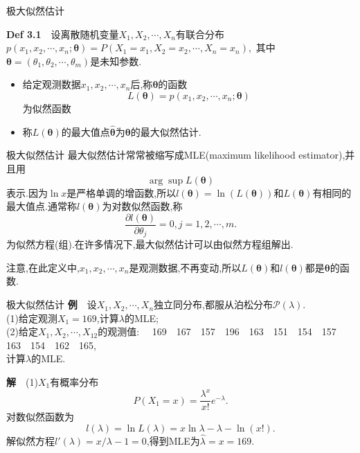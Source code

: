 	\begin{frame}{极大似然估计}
		\begin{block}{\textbf{Def 3.1}$\quad$设离散随机变量$X_1,X_2,\cdots,X_n$有联合分布}
			$p(x_1,x_2,\cdots,x_n;\bm{\theta}) = P(X_1=x_1,X_2=x_2,\cdots,X_n=x_n),$
			其中$\bm{\theta} = (\theta_1,\theta_2,\cdots,\theta_m)$是未知参数.
			\begin{itemize}
				\item 给定观测数据$x_1,x_2,\cdots,x_n$后,称$\bm{\theta}$的函数\begin{equation}
					L(\bm{\theta}) = p(x_1,x_2,\cdots,x_n;\bm{\theta})
				\end{equation}
				为\alert{似然函数}
				\item 称$L(\bm{\theta})$的最大值点$\widehat{\bm{\theta}}$为$\bm{\theta}$的\alert{最大似然估计}.
			\end{itemize}
		\end{block}
	\end{frame}

	\begin{frame}{极大似然估计}
		最大似然估计常常被缩写成MLE(maximum likelihood estimator),并且用
		\begin{equation}
			\arg\sup L(\bm{\theta})
		\end{equation}
		表示.因为$\ln x$是严格单调的增函数,所以$l(\bm{\theta}) = \ln(L(\bm{\theta}))$和$L(\bm{\theta})$有相同的最大值点.通常称$l(\bm{\theta})$为\alert{对数似然函数},称
		\begin{equation}
			\frac{\partial l(\bm{\theta})}{\partial \theta_j} = 0,j = 1,2,\cdots,m.
		\end{equation}
		为似然方程(组).在许多情况下,最大似然估计可以由似然方程组解出.
		
		注意,在此定义中,$x_1,x_2,\cdots,x_n$是观测数据,不再变动,所以$L(\bm{\theta})$和$l(\bm{\theta})$都是$\bm{\theta}$的函数.
	\end{frame}

	\begin{frame}{极大似然估计}
		\textbf{例}$\quad$设$X_1,X_2,\cdots,X_n$独立同分布,都服从泊松分布$\mathcal{P}(\lambda)$.\\
		(1)给定观测$X_1 = 169$,计算$\lambda$的MLE;\\
		(2)给定$X_1,X_2,\cdots,X_{12}$的观测值:
			$\quad$169$\quad$167$\quad$157$\quad$196$\quad$163$\quad$151$\quad$154$\quad$157$\quad$163$\quad$154$\quad$162$\quad$165,\\
			计算$\lambda$的MLE.
			
		\textbf{解}$\quad$(1)$X_1$有概率分布
			\begin{equation}
				P(X_1 = x) = \frac{\lambda^x}{x!}e^{-\lambda}.
			\end{equation}
			对数似然函数为
			\begin{equation}
				l(\lambda) = \ln L(\lambda) = x\ln \lambda - \lambda - \ln(x!).
			\end{equation}
			解似然方程$l'(\lambda) = x/\lambda -1 = 0 $,得到MLE为$\widehat{\lambda} = x = 169$.
	\end{frame}

